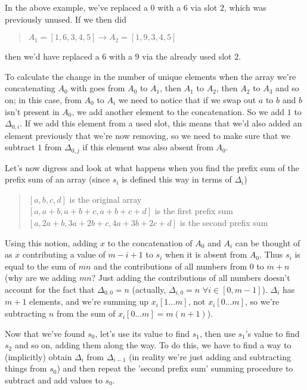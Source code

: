 \documentclass{article}
\begin{document}
In the above example, we've replaced a $0$ with a $6$ via slot $2$, which was previously unused. If we then did

\begin{quote}
$A_1=[1,6,3,4,5] \rightarrow A_2=[1,9,3,4,5]$
\end{quote}

then we'd have replaced a $6$ with a $9$ via the already used slot $2$.

To calculate the change in the number of unique elements when the array we're concatenating $A_0$ with goes from $A_0$ to $A_1$, then $A_1$ to $A_2$, then $A_2$ to $A_3$ and so on; in this case, from $A_0$ to $A_i$ we need to notice that if we swap out $a$ to $b$ and $b$ isn't present in $A_0$, we add another element to the concatenation. So we add $1$ to $\Delta_{0,i}$. If we add this element from a used slot, this means that we'd also added an element previously that we're now removing, so we need to make sure that we subtract $1$ from $\Delta_{0,j}$ if this element was also absent from $A_0$.

Let's now digress and look at what happens when you find the prefix sum of the prefix sum of an array (since $s_i$ is defined this way in terms of $\Delta_i$)

\begin{quote}
$[a,b,c,d]$ is the original array\\
$[a,a+b,a+b+c,a+b+c+d]$ is the first prefix sum\\
$[a,2a+b,3a+2b+c,4a+3b+2c+d]$ is the second prefix sum\\
\end{quote}

Using this notion, adding $x$ to the concatenation of $A_0$ and $A_i$ can be thought of as $x$ contributing a value of $m-i+1$ to $s_i$ when it is absent from $A_0$. Thus $s_i$ is equal to the sum of $mn$ and the contributions of all numbers from $0$ to $m+n$ (why are we adding $mn$? Just adding the contributions of all numbers doesn't account for the fact that $\Delta_{0,0}=n$ (actually, $\Delta_{i,0}=n$ $\forall i \in [0,m-1]$). $\Delta_i$ has $m+1$ elements, and we're summing up $x_i[1...m]$, not $x_i[0...m]$, so we're subtracting $n$ from the sum of $x_i[0...m]=m(n+1)$).

Now that we've found $s_0$, let's use its value to find $s_1$, then use $s_1$'s value to find $s_2$ and so on, adding them along the way. To do this, we have to find a way to (implicitly) obtain $\Delta_i$ from $\Delta_{i-1}$ (in reality we're just adding and subtracting things from $s_0$) and then repeat the 'second prefix sum' summing procedure to subtract and add values to $s_0$.
\end{document}
